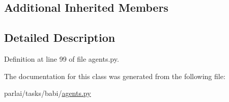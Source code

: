 \subsection*{Additional Inherited Members}


\subsection{Detailed Description}


Definition at line 99 of file agents.\+py.



The documentation for this class was generated from the following file\+:\begin{DoxyCompactItemize}
\item 
parlai/tasks/babi/\hyperlink{parlai_2tasks_2babi_2agents_8py}{agents.\+py}\end{DoxyCompactItemize}
